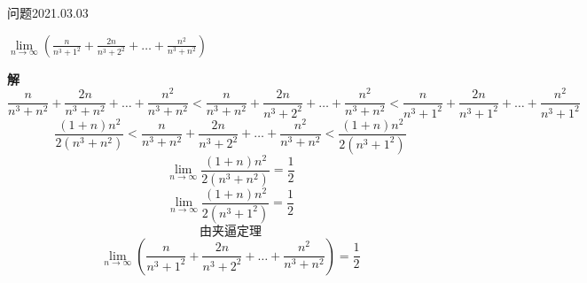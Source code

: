 \begin{mybox}{问题2021.03.03}
	
	\qquad $\lim \limits_{n \to \infty}(\frac{n}{n^3+1^2}+\frac{2n}{n^3+2^2}+\dots +\frac{n^2}{n^3+n^2})$
\end{mybox}
\noindent
\textbf{解}
$$\frac{n}{n^3+n^2}+\frac{2n}{n^3+n^2}+\dots +\frac{n^2}{n^3+n^2}<\frac{n}{n^3+n^2}+\frac{2n}{n^3+2^2}+\dots +\frac{n^2}{n^3+n^2}<\frac{n}{n^3+1^2}+\frac{2n}{n^3+1^2}+\dots +\frac{n^2}{n^3+1^2}$$
$$\frac{(1+n)n^2}{2(n^3+n^2)}<\frac{n}{n^3+n^2}+\frac{2n}{n^3+2^2}+\dots +\frac{n^2}{n^3+n^2}<\frac{(1+n)n^2}{2(n^3+1^2)}$$
$$\lim\limits_{n \to \infty} \frac{(1+n)n^2}{2(n^3+n^2)}=\frac{1}{2}$$
$$\lim\limits_{n \to \infty} \frac{(1+n)n^2}{2(n^3+1^2)}=\frac{1}{2}$$
$$\text{由夹逼定理}$$
$$\lim \limits_{n \to \infty}(\frac{n}{n^3+1^2}+\frac{2n}{n^3+2^2}+\dots +\frac{n^2}{n^3+n^2})=\frac{1}{2}$$